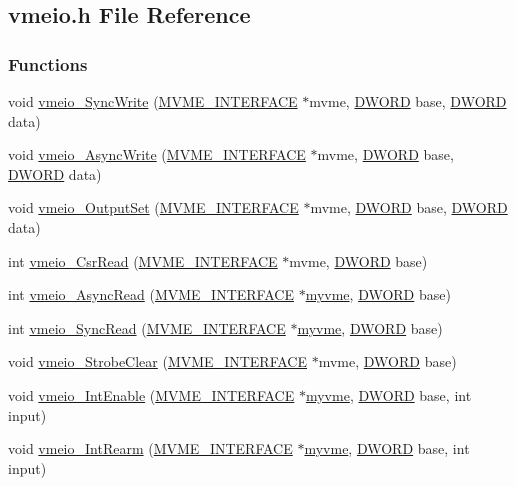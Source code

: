 \subsection{vmeio.h File Reference}
\label{vmeio_8h}
\subsubsection*{Functions}
\begin{DoxyCompactItemize}
\item 
void \hyperlink{vmeio_8h_a290874443aa721fdcdaad1d1eaab284e}{vmeio\_\-SyncWrite} (\hyperlink{structMVME__INTERFACE}{MVME\_\-INTERFACE} $\ast$mvme, \hyperlink{vt2_8h_a798af1e30bc65f319c1a246cecf59e39}{DWORD} base, \hyperlink{vt2_8h_a798af1e30bc65f319c1a246cecf59e39}{DWORD} data)
\item 
void \hyperlink{vmeio_8h_a4e36c63f5bead10c1b534d26b3775662}{vmeio\_\-AsyncWrite} (\hyperlink{structMVME__INTERFACE}{MVME\_\-INTERFACE} $\ast$mvme, \hyperlink{vt2_8h_a798af1e30bc65f319c1a246cecf59e39}{DWORD} base, \hyperlink{vt2_8h_a798af1e30bc65f319c1a246cecf59e39}{DWORD} data)
\item 
void \hyperlink{vmeio_8h_a87be831df449180bb5b3da3c35b8e714}{vmeio\_\-OutputSet} (\hyperlink{structMVME__INTERFACE}{MVME\_\-INTERFACE} $\ast$mvme, \hyperlink{vt2_8h_a798af1e30bc65f319c1a246cecf59e39}{DWORD} base, \hyperlink{vt2_8h_a798af1e30bc65f319c1a246cecf59e39}{DWORD} data)
\item 
int \hyperlink{vmeio_8h_a25961e0bc69e5694ead08873b6af0a11}{vmeio\_\-CsrRead} (\hyperlink{structMVME__INTERFACE}{MVME\_\-INTERFACE} $\ast$mvme, \hyperlink{vt2_8h_a798af1e30bc65f319c1a246cecf59e39}{DWORD} base)
\item 
int \hyperlink{vmeio_8h_a430d0ca0a0601d0f445fbc4e12f13af5}{vmeio\_\-AsyncRead} (\hyperlink{structMVME__INTERFACE}{MVME\_\-INTERFACE} $\ast$\hyperlink{fevmemodules_8c_aeab89db2ad759342a32dcd50a0a0156c}{myvme}, \hyperlink{vt2_8h_a798af1e30bc65f319c1a246cecf59e39}{DWORD} base)
\item 
int \hyperlink{vmeio_8h_a32066d5e2fc78836d5ac3dc4a70ac9af}{vmeio\_\-SyncRead} (\hyperlink{structMVME__INTERFACE}{MVME\_\-INTERFACE} $\ast$\hyperlink{fevmemodules_8c_aeab89db2ad759342a32dcd50a0a0156c}{myvme}, \hyperlink{vt2_8h_a798af1e30bc65f319c1a246cecf59e39}{DWORD} base)
\item 
void \hyperlink{vmeio_8h_a6c0e26f9ea71ab16bd4adaa322cdc3bc}{vmeio\_\-StrobeClear} (\hyperlink{structMVME__INTERFACE}{MVME\_\-INTERFACE} $\ast$mvme, \hyperlink{vt2_8h_a798af1e30bc65f319c1a246cecf59e39}{DWORD} base)
\item 
void \hyperlink{vmeio_8h_a435b8c9a42cccfa95a10ae2b6030f416}{vmeio\_\-IntEnable} (\hyperlink{structMVME__INTERFACE}{MVME\_\-INTERFACE} $\ast$\hyperlink{fevmemodules_8c_aeab89db2ad759342a32dcd50a0a0156c}{myvme}, \hyperlink{vt2_8h_a798af1e30bc65f319c1a246cecf59e39}{DWORD} base, int input)
\item 
void \hyperlink{vmeio_8h_a5d16a82b1b6620fc8c2622682c32182b}{vmeio\_\-IntRearm} (\hyperlink{structMVME__INTERFACE}{MVME\_\-INTERFACE} $\ast$\hyperlink{fevmemodules_8c_aeab89db2ad759342a32dcd50a0a0156c}{myvme}, \hyperlink{vt2_8h_a798af1e30bc65f319c1a246cecf59e39}{DWORD} base, int input)
\end{DoxyCompactItemize}
